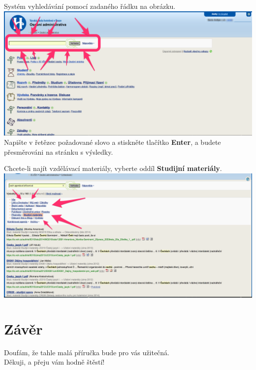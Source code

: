 \documentclass[a4paper,12pt]{article}
\begin{document}
Systém vyhledávání pomocí zadaného řádku na obrázku. \\

\includegraphics[width=\textwidth]{s20} \\

Napište v řetězec požadované slovo a stiskněte tlačítko \textbf{Enter}, 
a budete přesměrováni na stránku s výsledky.

Chcete-li najít vzdělávací materiály, vyberte oddíl \textbf{Studijní materiály}. \\

\includegraphics[width=\textwidth]{s21} \\

\newpage

\section{Závěr}

Doufám, že tahle malá příručka bude pro vás užitečná. \\
Děkuji, a přeju vám hodně štěstí!
\end{document}
